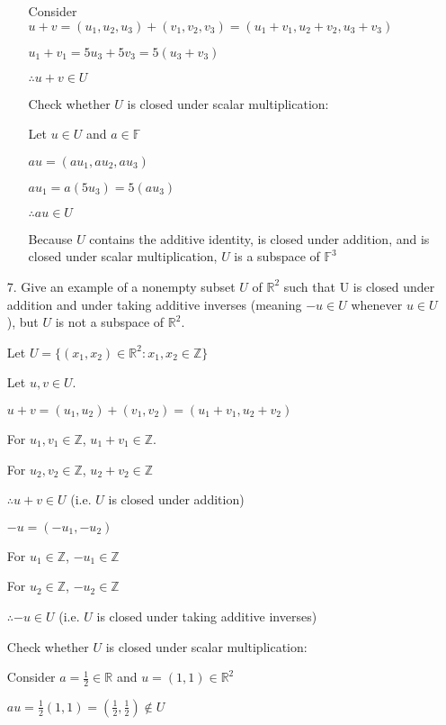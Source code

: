 \documentclass{article}
\begin{document}
\begin{enumerate}[nolistsep]
\begin{enumerate}[nolistsep]
			Consider $u + v = (u_1, u_2, u_3) + (v_1, v_2, v_3) = (u_1 + v_1, u_2 + v_2, u_3 + v_3)$
			
			$u_1 + v_1 = 5u_3 + 5v_3 = 5(u_3 + v_3)$
			
			$\therefore u + v \in U$
			
			Check whether $U$ is closed under scalar multiplication:
			
			Let $u \in U$ and $a \in \mathbb{F}$
			
			$au = (au_1, au_2, au_3)$
			
			$au_1 = a(5u_3) = 5(au_3)$
			
			$\therefore au \in U$
			
			Because $U$ contains the additive identity, is closed under addition, and is closed under scalar multiplication, $U$ is a subspace of $\mathbb{F}^3$
			
		\end{enumerate}
		
		\item[7.] Give an example of a nonempty subset $U$ of $\mathbb{R}^2$ such that U is closed under addition and under taking additive inverses (meaning $-u \in U$ whenever $u \in U$), but $U$ is not a subspace of $\mathbb{R}^2$.
		
		Let $U = \{(x_1, x_2) \in \mathbb{R}^2 : x_1, x_2 \in \mathbb{Z}\}$
		
		Let $u, v \in U$.
		
		$u + v = (u_1, u_2) + (v_1, v_2) = (u_1 + v_1, u_2 + v_2)$
		
		For $u_1, v_1 \in \mathbb{Z}$, $u_1 + v_1 \in \mathbb{Z}$.
		
		For $u_2, v_2 \in \mathbb{Z}$, $u_2 + v_2 \in \mathbb{Z}$
		
		$\therefore u + v \in U$ (i.e. $U$ is closed under addition)
		
		$-u = (-u_1, -u_2)$
		
		For $u_1 \in \mathbb{Z}$, $-u_1 \in \mathbb{Z}$
		
		For $u_2 \in \mathbb{Z}$, $-u_2 \in \mathbb{Z}$
		
		$\therefore -u \in U$ (i.e. $U$ is closed under taking additive inverses)
		
		Check whether $U$ is closed under scalar multiplication:
		
		Consider $a = \frac{1}{2} \in \mathbb{R}$ and $u = (1, 1) \in \mathbb{R}^2$
		
		$au = \frac{1}{2}(1, 1) = (\frac{1}{2}, \frac{1}{2}) \not\in U$
		

\end{enumerate}
\end{document}
